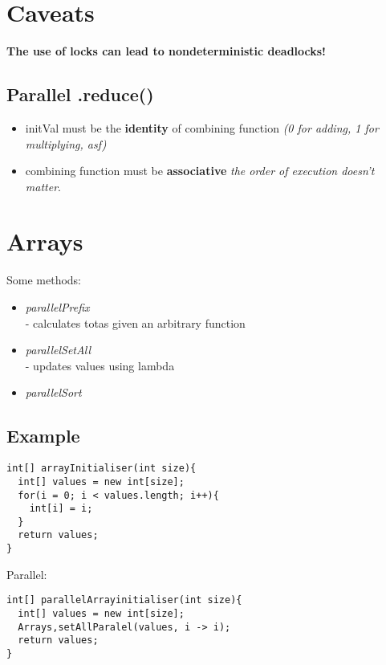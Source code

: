 \documentclass{report}
\begin{document}
\section{Caveats}
\textbf{The use of locks can lead to nondeterministic deadlocks!}

\subsection{Parallel .reduce()}
\begin{itemize}
	\item initVal must be the \textbf{identity} of combining function \textit{(0 for adding, 1 for multiplying, asf)}
	\item combining function must be \textbf{associative} \textit{the order of execution doesn't matter}.
\end{itemize}

\section{Arrays}
Some methods:
\begin{itemize}
	\item \textit{parallelPrefix}\\
	- calculates totas given an arbitrary function
	\item \textit{parallelSetAll}\\
	- updates values using lambda
	\item \textit{parallelSort}
\end{itemize}

\subsection*{Example}
\begin{verbatim}
int[] arrayInitialiser(int size){
  int[] values = new int[size];
  for(i = 0; i < values.length; i++){
    int[i] = i;
  }
  return values;
}
\end{verbatim}
Parallel:
\begin{verbatim}
int[] parallelArrayinitialiser(int size){
  int[] values = new int[size];
  Arrays,setAllParalel(values, i -> i);
  return values;
}
\end{verbatim}
\end{document}
